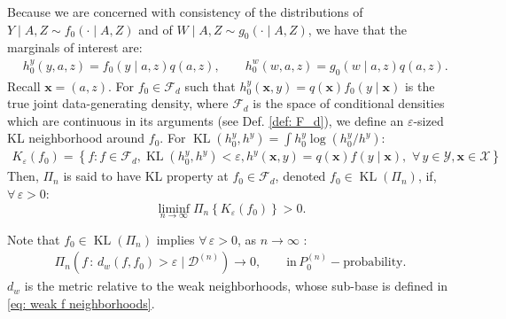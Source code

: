 Because we are concerned with consistency of the distributions of $Y \mid A,Z \sim f_0( \cdot \mid A,Z)$ and of $ W \mid A,Z \sim g_0( \cdot \mid A,Z)$, we have that the marginals of interest are:
\begin{align*}
    &h^y_0(y,a,z) = f_0(y \mid a,z) q(a,z), \quad \quad h^w_0(w,a,z) = g_0(w \mid a,z) q(a,z).
\end{align*}
Recall $\boldsymbol{x} = (a,z)$. For $f_0 \in \mathcal{F}_d$ such that $h^y_0(\boldsymbol{x}, y)=q(\boldsymbol{x}) f_0(y \mid \boldsymbol{x})$ is the true joint data-generating density, where $\mathcal{F}_d$ is the space of conditional densities which are continuous in its arguments (see Def. \ref{def: F_d}), we define an $\varepsilon$-sized KL neighborhood around $f_0$. 
For $\operatorname{KL}\left(h^y_0, h^y\right)=\int h^y_0 \log \left(h^y_0 / h^y \right)$: 
\begin{align}
  K_\varepsilon\left(f_0\right)=\left\{f: f \in \mathcal{F}_d, \operatorname{KL}\left(h^y_0, h^y \right)<\varepsilon, h^y(\boldsymbol{x}, y)=q(\boldsymbol{x}) f(y \mid \boldsymbol{x}), \, \, \forall \, y \in \mathcal{Y}, \boldsymbol{x} \in \mathcal{X}\right\}  
\end{align}
Then, $\Pi_n$ is said to have KL property at $f_0 \in \mathcal{F}_d$, denoted $f_0 \in \operatorname{KL}\left(\Pi_n\right)$, if, $\forall \, \varepsilon >0$: 
$$\liminf_{n \rightarrow \infty} \Pi_n\left\{K_\varepsilon\left(f_0\right)\right\}>0.$$
\begin{remark}
    Note that $f_0 \in \operatorname{KL}\left(\Pi_n\right)$ implies $\forall \, \varepsilon > 0$, as $n \rightarrow \infty$ :
    \begin{align}\label{eq: weak convergence}
    \Pi_n\left(f \, : \, d_w\left(f, f_0\right)>\varepsilon \mid \mathcal{D}^{(n)}\right) \rightarrow 0, \quad \quad \text{in} \, P^{(n)}_0-\text{probability}.
    \end{align}
    $d_w$ is the metric relative to the weak neighborhoods, whose sub-base is defined in \eqref{eq: weak f neighborhoods}.
\end{remark}

